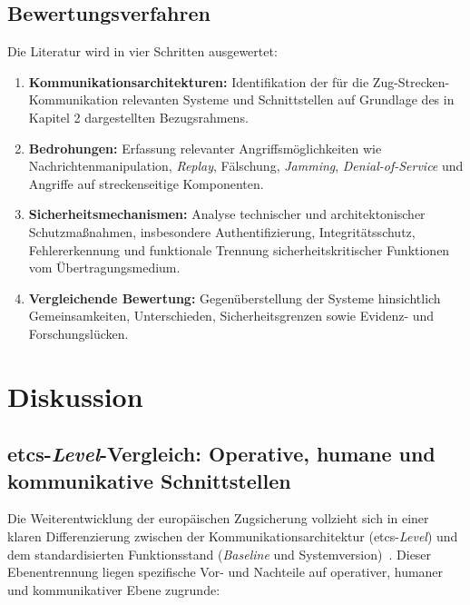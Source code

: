\documentclass[runningheads]{res/llncs}
\begin{document}
\subsection{Bewertungsverfahren}
\label{sec:Bewertungsverfahren}

Die Literatur wird in vier Schritten ausgewertet:

\begin{enumerate}
    \item \textbf{Kommunikationsarchitekturen:} Identifikation der für die Zug-Strecken-Kommunikation relevanten Systeme und Schnittstellen auf Grundlage des in Kapitel 2 dargestellten Bezugsrahmens.

    \item \textbf{Bedrohungen:} Erfassung relevanter Angriffsmöglichkeiten wie Nachrichtenmanipulation, \textit{Replay}, Fälschung, \textit{Jamming}, \textit{Denial-of-Service} und Angriffe auf streckenseitige Komponenten.

    \item \textbf{Sicherheitsmechanismen:} Analyse technischer und architektonischer Schutzmaßnahmen, insbesondere Authentifizierung, Integritätsschutz, Fehlererkennung und funktionale Trennung sicherheitskritischer Funktionen vom Übertragungsmedium.

    \item \textbf{Vergleichende Bewertung:} Gegenüberstellung der Systeme hinsichtlich Gemeinsamkeiten, Unterschieden, Sicherheitsgrenzen sowie Evidenz- und Forschungslücken.
\end{enumerate}

\section{Diskussion}
\label{sec:Diskussion}

\subsection{\texorpdfstring{\gls{etcs}-\textit{Level}-Vergleich: Operative, humane und kommunikative Schnittstellen}{ETCS-Level-Vergleich: Operative, humane und kommunikative Schnittstellen}}
\label{sec:ETCS-Level-Vergleich_Operative_humane_und_kommunikative_Schnittstellen}
Die Weiterentwicklung der europäischen Zugsicherung vollzieht sich in einer klaren Differenzierung zwischen der Kommunikationsarchitektur (\gls{etcs}-\textit{Level}) und dem standardisierten Funktionsstand (\textit{Baseline} und Systemversion)~\parencite[S. 50--53]{trinckaufETCS2024}. Dieser Ebenentrennung liegen spezifische Vor- und Nachteile auf operativer, humaner und kommunikativer Ebene zugrunde:
\end{document}
